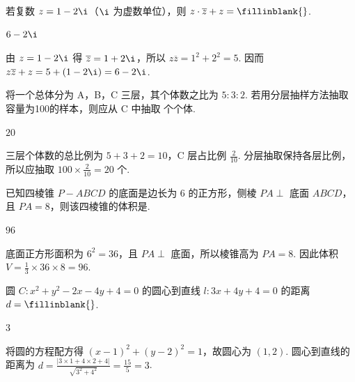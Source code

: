 \begin{problem}
若复数 \(z = 1 - 2\i\)（\(\i\) 为虚数单位），则 \(z \cdot \overline{z} + z =\fillinblank{}\).
\end{problem}

\begin{answer}
\(6-2\i\)
\end{answer}

\begin{solution}
由 \(z=1-2\i\) 得 \(\overline z=1+2\i\)，所以 \(z\overline z=1^2+2^2=5\). 因而 \(z\overline z+z=5+(1-2\i)=6-2\i\).
\end{solution}

\begin{problem}
将一个总体分为 A，B，C 三层，其个体数之比为 \(5:3:2\). 若用分层抽样方法抽取容量为100的样本，则应从 C 中抽取\fillinblank{} 个个体.
\end{problem}

\begin{answer}
\(20\)
\end{answer}

\begin{solution}
三层个体数的总比例为 \(5+3+2=10\)，C 层占比例 \(\frac{2}{10}\). 分层抽取保持各层比例，所以应抽取 \(100\times\frac{2}{10}=20\) 个.
\end{solution}

\begin{problem}
已知四棱锥 \(P - ABCD\) 的底面是边长为 6 的正方形，侧棱 \(PA \perp\) 底面 \(ABCD\)，且 \(PA = 8\)，则该四棱锥的体积是\fillinblank{}.
\end{problem}

\begin{answer}
\(96\)
\end{answer}

\begin{solution}
底面正方形面积为 \(6^2=36\)，且 \(PA\perp\) 底面，所以棱锥高为 \(PA=8\). 因此体积
\(V=\frac{1}{3}\times36\times8=96\).
\end{solution}

\begin{problem}
圆 \(C: x^{2} + y^{2} - 2x - 4y + 4 = 0\) 的圆心到直线 \(l: 3x + 4y + 4 = 0\) 的距离 \(d =\fillinblank{}\).
\end{problem}

\begin{answer}
\(3\)
\end{answer}

\begin{solution}
将圆的方程配方得 \((x-1)^2+(y-2)^2=1\)，故圆心为 \((1,2)\). 圆心到直线的距离为
\(d=\frac{|3\times1+4\times2+4|}{\sqrt{3^2+4^2}}=\frac{15}{5}=3\).
\end{solution}

